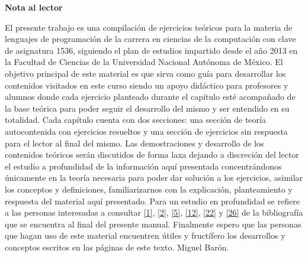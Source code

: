 \begin{center}
	\large
	{\bf Nota al lector}
\end{center}
	El presente trabajo es una compilación de ejercicios teóricos para la materia de lenguajes de programación de la carrera en ciencias de la computación con clave de asignatura 1536, siguiendo el plan de estudios impartido desde el año 2013 en la Facultad de Ciencias de la Universidad Nacional Autónoma de México.\newline\newline
	El objetivo principal de este material es que sirva como guía para desarrollar los contenidos visitados en este curso siendo un apoyo didáctico para profesores y alumnos donde cada ejercicio planteado durante el capítulo esté acompañado de la base teórica para poder seguir el desarrollo del mismo y ser entendido en su totalidad.\newline\newline
	Cada capítulo cuenta con dos secciones: una sección de teoría autocontenida con ejercicios resueltos y una sección de ejercicios sin respuesta para el lector al final del mismo. \newline\newline
	Las demostraciones y desarrollo de los contenidos teóricos serán discutidos de forma laxa dejando a discreción del lector el estudio a profundidad de la información aquí presentada concentrándonos únicamente en la teoría necesaria para poder dar solución a los ejercicios, asimilar los conceptos y definiciones, familiarizarnos con la explicación, planteamiento y respuesta del material aquí presentado. \newline\newline
	Para un estudio en profundidad se refiere a las personas interesadas a consultar  \hyperlink{1}{[1]},   \hyperlink{2}{[2]},   \hyperlink{5}{[5]},   \hyperlink{12}{[12]},  \hyperlink{22}{[22]} y  \hyperlink{26}{[26]} de la bibliografía que se encuentra al final del presente manual.\newline\newline 
	Finalmente espero que las personas que hagan uso de este material encuentren útiles y fructífero los desarrollos y conceptos escritos en las páginas de este texto. \newline\newline\newline\newline\newline
	Miguel Barón.

\vspace{50mm}

\newpage
\phantom{~}
\newpage